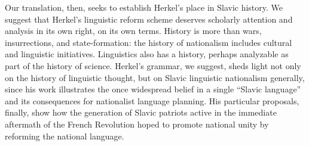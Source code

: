 Our translation, then, seeks to establish Herkel’s place in Slavic history. We suggest that Herkel’s linguistic reform scheme deserves scholarly attention and analysis in its own right, on its own terms. History is more than wars, insurrections, and state-formation: the history of nationalism includes cultural and linguistic initiatives. Linguistics also has a history, perhaps analyzable as part of the history of science. Herkel’s grammar, we suggest, sheds light not only on the history of linguistic thought, but on Slavic linguistic nationalism generally, since his work illustrates the once widespread belief in a single “Slavic language” and its consequences for nationalist language planning. His particular proposals, finally, show how the generation of Slavic patriots active in the immediate aftermath of the French Revolution hoped to promote national unity by reforming the national language.
